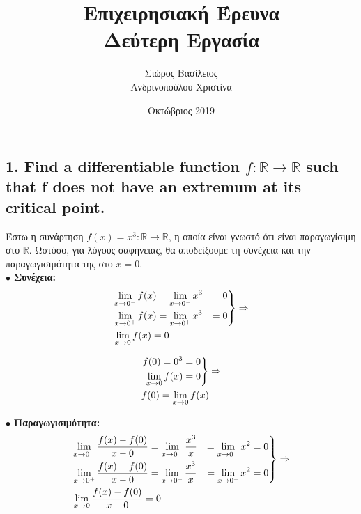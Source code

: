 \documentclass[12pt]{article}
\title{\hugeΑλγοριθμική Επιχειρησιακή Έρευνα\\Δεύτερη Εργασία}
\author{Σιώρος Βασίλειος\\Ανδρινοπούλου Χριστίνα}
\date{Οκτώβριος 2019}
\newcommand{\R}{\mathbb{R}}
\newenvironment{rcases}
	{\left.\begin{aligned}}
	{\end{aligned}\right\rbrace}
\begin{document}
\maketitle


\pagebreak


\subsection*{1. Find a differentiable function \( f: \R \rightarrow \R \) such that f does not have an extremum at its
critical point.}

Έστω η συνάρτηση \( f(x) = x^3 : \R \rightarrow \R \), η οποία είναι γνωστό ότι είναι
παραγωγίσιμη στο \( \R \). Ωστόσο, για λόγους σαφήνειας, θα αποδείξουμε τη συνέχεια και την παραγωγισιμότητα της
στο \( x = 0 \). \\

\( \bullet \) \textbf{Συνέχεια:} \\

\begin{align*}
    &\begin{rcases}
        \lim_{x \to 0^-} f(x) & = \lim_{x \to 0^-} x^3 & = 0 \\
        \lim_{x \to 0^+} f(x) & = \lim_{x \to 0^+} x^3 & = 0
    \end{rcases}
    \Rightarrow \\
    &\lim_{x \to 0} f(x) = 0
\end{align*}

\begin{align*}
    &\begin{rcases}
        f(0) = 0^3 & = 0 \\
        \lim_{x \to 0} f(x) & = 0
    \end{rcases}
    \Rightarrow \\
    &f(0) = \lim_{x \to 0} f(x)
\end{align*}

\( \bullet \) \textbf{Παραγωγισιμότητα:} \\

\begin{align*}
    &\begin{rcases}
        \lim_{x \to 0^-} \frac{f(x) - f(0)}{x - 0} &= \lim_{x \to 0^-} \frac{x^3}{x} &= \lim_{x \to 0^-} x^2 &= 0 \\
        \lim_{x \to 0^+} \frac{f(x) - f(0)}{x - 0} &= \lim_{x \to 0^+} \frac{x^3}{x} &= \lim_{x \to 0^+} x^2 &= 0
    \end{rcases}
    \Rightarrow \\
    &\lim_{x \to 0} \frac{f(x) - f(0)}{x - 0} = 0
\end{align*} \\
\end{document}
